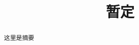 \documentclass{myclass}
\title{暂定}
\begin{document}
\begin{abstract}
这里是摘要
\end{abstract}






\end{document}
